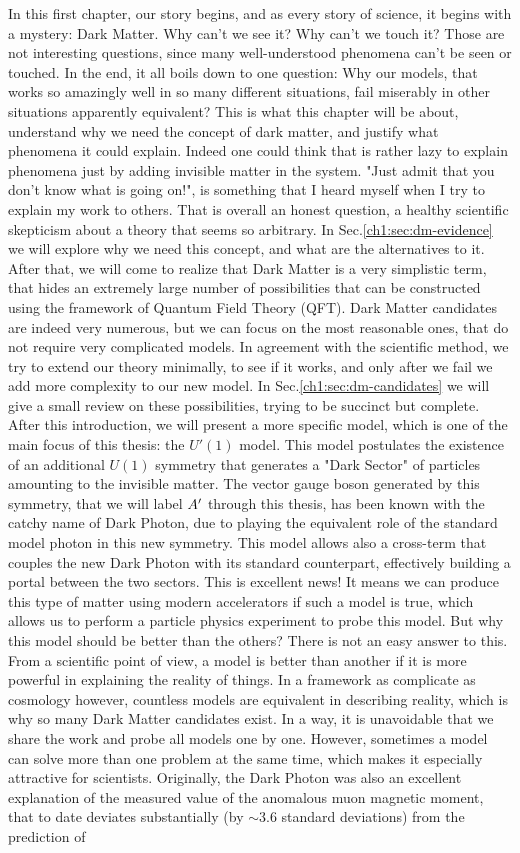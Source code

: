 In this first chapter, our story begins, and as every story of science, it begins with a mystery: Dark Matter. Why can't we see it? Why can't we touch it? Those are not interesting questions, since many well-understood phenomena can't be seen or touched. In the end, it all boils down to one question: Why our models, that works so amazingly well in so many different situations, fail miserably in other situations apparently equivalent? This is what this chapter will be about, understand why we need the concept of dark matter, and justify what phenomena it could explain. Indeed one could think that is rather lazy to explain phenomena just by adding invisible matter in the system. "Just admit that you don't know what is going on!", is something that I heard myself when I try to explain my work to others. That is overall an honest question, a healthy scientific skepticism about a theory that seems so arbitrary. In Sec.\ref{ch1:sec:dm-evidence} we will explore why we need this concept, and what are the alternatives to it. After that, we will come to realize that Dark Matter is a very simplistic term, that hides an extremely large number of possibilities that can be constructed using the framework of Quantum Field Theory (QFT). Dark Matter candidates are indeed very numerous, but we can focus on the most reasonable ones, that do not require very complicated models. In agreement with the scientific method, we try to extend our theory minimally, to see if it works, and only after we fail we add more complexity to our new model. In Sec.\ref{ch1:sec:dm-candidates} we will give a small review on these possibilities, trying to be succinct but complete. After this introduction, we will present a more specific model, which is one of the main focus of this thesis: the $U'(1)$ model. This model postulates the existence of an additional $U(1)$ symmetry that generates a "Dark Sector" of particles amounting to the invisible matter. The vector gauge boson generated by this symmetry, that we will label $A'$ through this thesis, has been known with the catchy name of Dark Photon, due to playing the equivalent role of the standard model photon in this new symmetry. This model allows also a cross-term that couples the new Dark Photon with its standard counterpart, effectively building a portal between the two sectors. This is excellent news! It means we can produce this type of matter using modern accelerators if such a model is true, which allows us to perform a particle physics experiment to probe this model. But why this model should be better than the others? There is not an easy answer to this. From a scientific point of view, a model is better than another if it is more powerful in explaining the reality of things. In a framework as complicate as cosmology however, countless models are equivalent in describing reality, which is why so many Dark Matter candidates exist. In a way, it is unavoidable that we share the work and probe all models one by one. However, sometimes a model can solve more than one problem at the same time, which makes it especially attractive for scientists. Originally, the Dark Photon was also an excellent explanation of the measured value of the anomalous muon magnetic moment, that to date deviates substantially (by $\sim$3.6 standard deviations) from the prediction of 